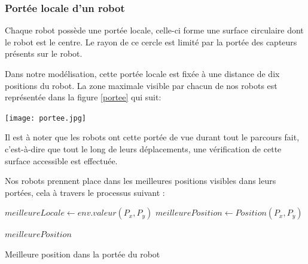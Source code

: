 \subsubsection{Portée locale d'un robot}
\label{porteee}
Chaque robot possède une portée locale, celle-ci forme une surface circulaire dont le robot est le centre. Le rayon de ce cercle est limité par la portée des capteurs présents sur le robot.

Dans notre modélisation, cette portée locale est fixée à une distance de dix positions du robot. La zone maximale visible par chacun de nos robots est représentée dans la figure \ref{portee} qui suit:


\begin{center}	  
	\texttt{[image: portee.jpg]}%
	\vspace{-0.1 cm}
	\label{portee}%
\end{center}

Il est à noter que les robots ont cette portée de vue durant tout le parcours fait, c'est-à-dire que tout le long de leurs déplacements, une vérification de cette surface accessible est effectuée. 

Nos robots prennent place dans les meilleures positions visibles dans leurs portées, cela à travers le processus suivant :\\

\begin{algorithm}[H]
	\SetAlgoLined
	
	
	\vspace{0.2cm}
	
	$meilleureLocale \gets env.valeur( P_x , P_y)$\;
	$meilleurePosition \gets Position(P_x,P_y)$\;
	
	\vspace{0.2cm}
	
	
	\Return$meilleurePosition$\;
	
	\caption{Meilleure position dans la portée du robot}
\end{algorithm}



